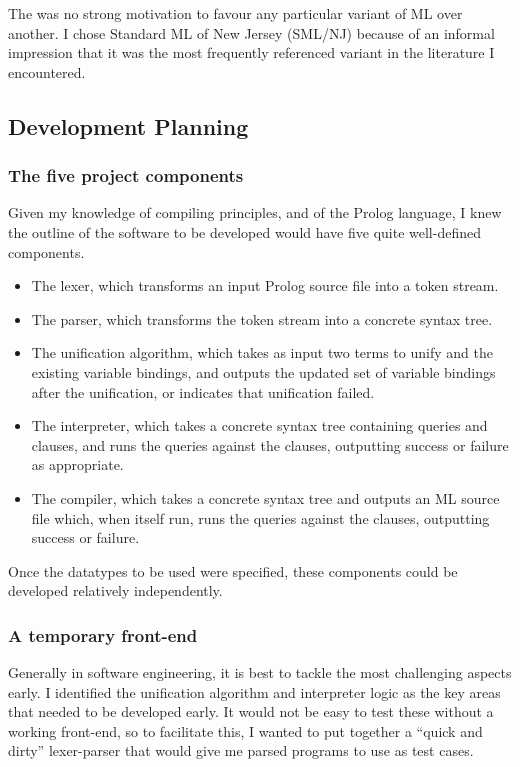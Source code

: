 \documentclass[12pt]{article}
\begin{document}
The was no strong motivation to favour any particular variant of ML over another.
I chose Standard ML of New Jersey (SML/NJ) because of an informal impression that it was the most frequently referenced variant in the literature I encountered.

\subsection{Development Planning}

\subsubsection{The five project components}

Given my knowledge of compiling principles, and of the Prolog language, I knew the outline of the software to be developed would have five quite well-defined components.

\begin{itemize}
\item The lexer, which transforms an input Prolog source file into a token stream.
\item The parser, which transforms the token stream into a concrete syntax tree.
\item The unification algorithm, which takes as input two terms to unify and the existing variable bindings, and outputs the updated set of variable bindings after the unification, or indicates that unification failed.
\item The interpreter, which takes a concrete syntax tree containing queries and clauses, and runs the queries against the clauses, outputting success or failure as appropriate.
\item The compiler, which takes a concrete syntax tree and outputs an ML source file which, when itself run, runs the queries against the clauses, outputting success or failure.
\end{itemize}

Once the datatypes to be used were specified, these components could be developed relatively independently.

\subsubsection{A temporary front-end}

Generally in software engineering, it is best to tackle the most challenging aspects early. 
I identified the unification algorithm and interpreter logic as the key areas that needed to be developed early. 
It would not be easy to test these without a working front-end, so to facilitate this, I wanted to put together a ``quick and dirty'' lexer-parser that would give me parsed programs to use as test cases.
\end{document}
